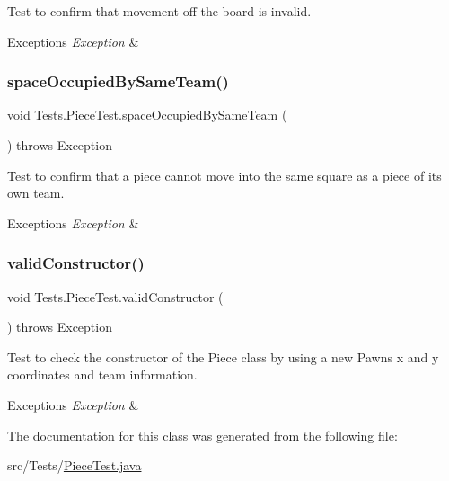 Test to confirm that movement off the board is invalid. 
\begin{DoxyExceptions}{Exceptions}
{\em Exception} & \\
\hline
\end{DoxyExceptions}
\hypertarget{class_tests_1_1_piece_test_af08d686557ed19d88e13e3b3e387ab39}{}\label{class_tests_1_1_piece_test_af08d686557ed19d88e13e3b3e387ab39} 
\subsubsection{\texorpdfstring{space\+Occupied\+By\+Same\+Team()}{spaceOccupiedBySameTeam()}}
{\footnotesize\ttfamily void Tests.\+Piece\+Test.\+space\+Occupied\+By\+Same\+Team (\begin{DoxyParamCaption}{ }\end{DoxyParamCaption}) throws Exception}

Test to confirm that a piece cannot move into the same square as a piece of its own team. 
\begin{DoxyExceptions}{Exceptions}
{\em Exception} & \\
\hline
\end{DoxyExceptions}
\hypertarget{class_tests_1_1_piece_test_aa826a8207b7c0c34461cadbd06e86683}{}\label{class_tests_1_1_piece_test_aa826a8207b7c0c34461cadbd06e86683} 
\subsubsection{\texorpdfstring{valid\+Constructor()}{validConstructor()}}
{\footnotesize\ttfamily void Tests.\+Piece\+Test.\+valid\+Constructor (\begin{DoxyParamCaption}{ }\end{DoxyParamCaption}) throws Exception}

Test to check the constructor of the Piece class by using a new Pawn\textquotesingle{}s x and y coordinates and team information. 
\begin{DoxyExceptions}{Exceptions}
{\em Exception} & \\
\hline
\end{DoxyExceptions}


The documentation for this class was generated from the following file\+:\begin{DoxyCompactItemize}
\item 
src/\+Tests/\hyperlink{_piece_test_8java}{Piece\+Test.\+java}\end{DoxyCompactItemize}
